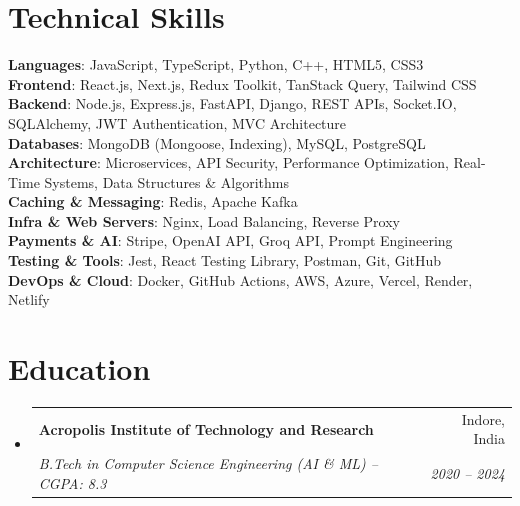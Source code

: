 \documentclass[letterpaper,11pt]{article}
\makeatletter
\newcommand{\resumeSubheading}[4]{
  \vspace{-2pt}\item
    \begin{tabular*}{0.97\textwidth}[t]{l@{\extracolsep{\fill}}r}
      \textbf{#1} & #2 \\
      \textit{\small#3} & \textit{\small #4} \\
    \end{tabular*}\vspace{-5pt}
}
\newcommand{\resumeSubHeadingListStart}{\begin{itemize}[leftmargin=0.15in, label={}]}
\newcommand{\resumeSubHeadingListEnd}{\end{itemize}}
\makeatother
\begin{document}
\section{Technical Skills}
 \begin{itemize}[leftmargin=0.15in, label={}, itemsep=-2pt, topsep=0pt, parsep=0pt]
    \small{\item{
     \textbf{Languages}{: JavaScript, TypeScript, Python, C++, HTML5, CSS3} \\
     \textbf{Frontend}{: React.js, Next.js, Redux Toolkit, TanStack Query, Tailwind CSS} \\
     \textbf{Backend}{: Node.js, Express.js, FastAPI, Django, REST APIs, Socket.IO, SQLAlchemy, JWT Authentication, MVC Architecture} \\
     \textbf{Databases}{: MongoDB (Mongoose, Indexing), MySQL, PostgreSQL} \\
     \textbf{Architecture}{: Microservices, API Security, Performance Optimization, Real-Time Systems, Data Structures \& Algorithms} \\
     \textbf{Caching \& Messaging}{: Redis, Apache Kafka} \\
     \textbf{Infra \& Web Servers}{: Nginx, Load Balancing, Reverse Proxy} \\
     \textbf{Payments \& AI}{: Stripe, OpenAI API, Groq API, Prompt Engineering} \\
     \textbf{Testing \& Tools}{: Jest, React Testing Library, Postman, Git, GitHub} \\
     \textbf{DevOps \& Cloud}{: Docker, GitHub Actions, AWS, Azure, Vercel, Render, Netlify} \\
    }}
 \end{itemize}

\section{Education}
  \resumeSubHeadingListStart
    \resumeSubheading
      {Acropolis Institute of Technology and Research}{Indore, India}
      {B.Tech in Computer Science Engineering (AI \& ML) -- CGPA: 8.3}{2020 -- 2024}
  \resumeSubHeadingListEnd
\end{document}
